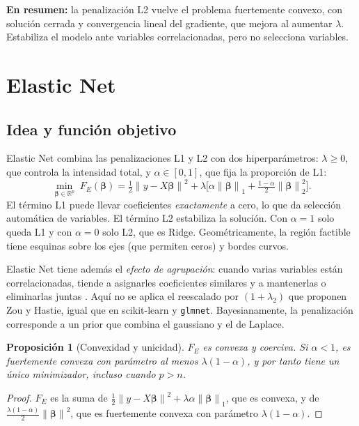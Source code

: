 \documentclass[11pt,a4paper]{article}
\newcommand{\resumen}[1]{\par\medskip\noindent\textbf{\color{acento}En resumen:} #1\par\medskip}
\newcommand{\R}{\mathbb{R}}
\newcommand{\norm}[1]{\left\lVert #1 \right\rVert}
\newcommand{\bt}{\bm{\beta}}
\theoremstyle{simple}
\newtheorem{proposicion}{Proposición}[section]
\begin{document}
\resumen{la penalización L2 vuelve el problema fuertemente convexo, con solución cerrada y convergencia lineal del gradiente, que mejora al aumentar $\lambda$. Estabiliza el modelo ante variables correlacionadas, pero no selecciona variables.}

\section{Elastic Net}\label{sec:en}

\subsection{Idea y función objetivo}
Elastic Net combina las penalizaciones L1 y L2 con dos hiperparámetros: $\lambda\ge0$, que controla la intensidad total, y $\alpha\in[0,1]$, que fija la proporción de L1:
\begin{equation}\label{eq:PE}
\min_{\bt\in\R^p}\; F_E(\bt)=\tfrac12\norm{y-X\bt}^2+\lambda\Big[\alpha\norm{\bt}_1+\tfrac{1-\alpha}{2}\norm{\bt}_2^2\Big].
\end{equation}
El término L1 puede llevar coeficientes \emph{exactamente} a cero, lo que da selección automática de variables. El término L2 estabiliza la solución. Con $\alpha=1$ solo queda L1 y con $\alpha=0$ solo L2, que es Ridge. Geométricamente, la región factible tiene esquinas sobre los ejes (que permiten ceros) y bordes curvos.

Elastic Net tiene además el \emph{efecto de agrupación}: cuando varias variables están correlacionadas, tiende a asignarles coeficientes similares y a mantenerlas o eliminarlas juntas \cite{zou2005}. Aquí no se aplica el reescalado por $(1+\lambda_2)$ que proponen Zou y Hastie, igual que en scikit-learn y \texttt{glmnet}. Bayesianamente, la penalización corresponde a un prior que combina el gaussiano y el de Laplace.

\begin{proposicion}[Convexidad y unicidad]\label{prop:convE}
$F_E$ es convexa y coerciva. Si $\alpha<1$, es fuertemente convexa con parámetro al menos $\lambda(1-\alpha)$, y por tanto tiene un único minimizador, incluso cuando $p>n$.
\end{proposicion}
\begin{proof}
$F_E$ es la suma de $\tfrac12\norm{y-X\bt}^2+\lambda\alpha\norm{\bt}_1$, que es convexa, y de $\tfrac{\lambda(1-\alpha)}{2}\norm{\bt}^2$, que es fuertemente convexa con parámetro $\lambda(1-\alpha)$.
\end{proof}
\end{document}
